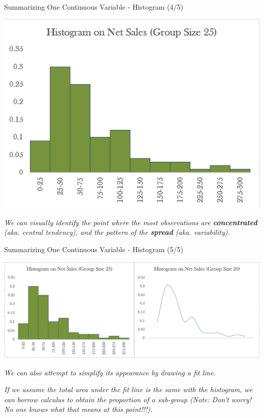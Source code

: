 \documentclass{beamer}
\begin{document}
\begin{frame}{Summarizing One Continuous Variable - Histogram (4/5)}

\begin{center}

\includegraphics[scale=0.5]{images/ch2Histogram.png}
\end{center}

\begin{center}
\textit{We can visually identify the point where the most observations are \textbf{concentrated} (aka. central tendency), and the pattern of the \textbf{spread} (aka. variability).  
}
\end{center}

\end{frame}


\begin{frame}{Summarizing One Continuous Variable - Histogram (5/5)}

\begin{center}
\includegraphics[scale=0.33]{images/ch2Histogram5.png}
\end{center}

\begin{center}
\textit{We can also attempt to simplify its appearance by drawing a fit line.}

\begin{scriptsize}
\textit{ 
If we assume the total area under the fit line is the same with the histogram, we can borrow calculus to obtain the proportion of a sub-group (Note: Don't worry! No one knows what that means at this point!!!).
}
\end{scriptsize}

\end{center}

\end{frame}
\end{document}
